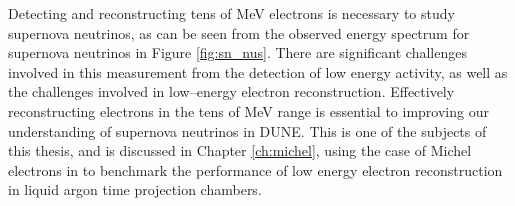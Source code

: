 Detecting and reconstructing tens of MeV electrons is necessary to study 
supernova neutrinos, as can be seen from the observed energy spectrum for 
supernova neutrinos in Figure \ref{fig:sn_nus}. There are significant 
challenges involved in this measurement from the detection of low energy 
activity, as well as the challenges involved in low--energy electron
reconstruction. Effectively reconstructing electrons in the tens of MeV range 
is essential to improving our understanding of supernova neutrinos in DUNE.  
This is one of the subjects of this thesis, and is discussed in Chapter 
\ref{ch:michel}, using the case of Michel electrons in \protodune{} to 
benchmark the performance of low energy electron reconstruction in liquid 
argon time projection chambers.
